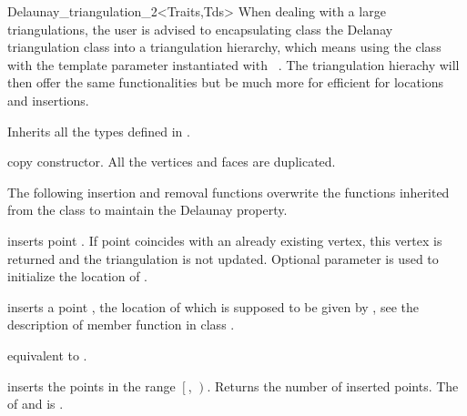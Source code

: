 \begin{ccRefClass}{Delaunay_triangulation_2<Traits,Tds>}
When dealing
with a large triangulations, the user is advised to 
encapsulating class the Delanay triangulation class into a
triangulation hierarchy, which means using the class
with the template parameter instantiated with \ccRefName\ .
The triangulation hierachy will then  offer the same 
functionalities  but be much more for efficient 
for locations and insertions.



\ccInheritsFrom


\ccTypes
Inherits all the types defined in  .

\ccCreation
{}  %


{copy constructor. All the vertices and faces are duplicated.}


The following insertion and removal  functions overwrite
the functions inherited from the class
 to maintain the Delaunay property.




{inserts  point .
If point  coincides with an already existing vertex, this 
vertex is returned and the triangulation is not updated.
Optional parameter  is used to initialize the location of .
}

{ inserts a point , the location of which is supposed to be
given by , see the description of member function
 in class .}

{equivalent to .}

{inserts the points in the range
 $\left[\right.$, $\left.\right)$.
 Returns the number of inserted points.
 \ccPrecond The  of  and 
 is .}




\end{ccRefClass}
